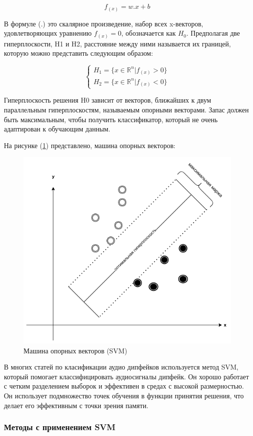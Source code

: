 \begin{equation}
    f_{(x)} = w.x + b
\end{equation}

В формуле (.) это скалярное произведение, набор всех x-векторов, удовлетворяющих уравнению \(f_{(x)} = 0\), обозначается как \(H_{0}\). Предполагая две гиперплоскости, H1 и H2, расстояние между ними называется их границей, которую можно представить следующим образом:

\begin{equation}
    \begin{cases}
        H_{1} = \{x \in \mathbb{R}^{n} | f_{(x)} > 0\} \\
        H_{2} = \{x \in \mathbb{R}^{n} | f_{(x)} < 0\}
    \end{cases}
\end{equation}

Гиперплоскость решения H0 зависит от векторов, ближайших к двум параллельным гиперплоскостям, называемым опорными векторами. Запас должен быть максимальным, чтобы получить классификатор, который не очень адаптирован к обучающим данным.

На рисунке (\ref{fig:support-vector-machine}) представлено, машина опорных векторов: 
\begin{figure}[H]
	\centering
	\includegraphics[width=0.4\linewidth]{images/support-vector-machine.png}
	\caption{Машина опорных векторов (SVM)}
	\label{fig:support-vector-machine}
\end{figure}

В многих статей по класификации аудио дипфейков используется метод SVM, который помогает классифицировать аудиосигналы дипфейк. Он хорошо работает с четким разделением выборок и эффективен в средах с высокой размерностью. Он использует подмножество точек обучения в функции принятия решения, что делает его эффективным с точки зрения памяти.

\subsubsection*{Методы с применением SVM}

